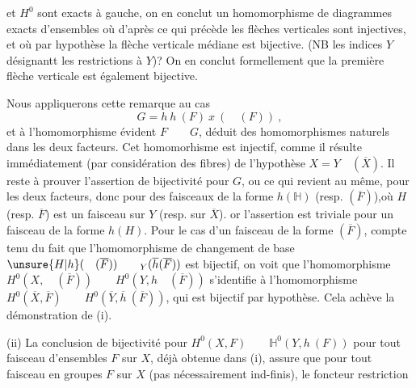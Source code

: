 
et $H^0$ sont exacts à gauche, on en conclut un homomorphisme de diagrammes exacts d'ensembles
où d'après ce qui précède les flèches verticales sont injectives, et où par hypothèse la flèche verticale médiane est bijective. (NB les indices $Y$ désignantt les restrictions à $Y$)? On en conclut formellement que la première flèche verticale est également bijective.

Nous appliquerons cette remarque au cas 
\[
G=h\ h\ (F)\ x\ (\quad(F))\ ,
\]
et à l'homomorphisme évident $F\qquad G$, déduit des homomorphismes naturels dans les deux facteurs. Cet homomorhisme est injectif, comme il résulte immédiatement (par considération des fibres) de l'hypothèse $X=Y\quad(\overline{X})$. Il reste à prouver l'assertion de bijectivité pour $G$, ou ce qui revient au même, pour les deux facteurs, donc pour des faisceaux de la forme $h(\mathbb{H})$ (resp. $(\overline{F})$),où $H$ (resp. $\overline{F}$) est un faisceau sur $Y$ (resp. sur $\overline{X}$). or l'assertion est triviale pour un faisceau de la forme $h(H)$. Pour le cas d'un faisceau de la forme $(\overline{F})$, compte tenu du fait que l'homomorphisme de changement de base $\unsure{H|h}(\quad(\overline{F}))\qquad{}_{Y}(\overline{h}(\overline{F}))$ est bijectif, on voit que l'homomorphisme $H^0(X,\quad(\overline{F}))\qquad H^0(Y,h\quad(\overline{F}))$ s'identifie à l'homomorphisme $H^0(\overline{X},\overline{F})\qquad H^0(\overline{Y},\overline{h}\ (\overline{F}))$, qui est bijectif par hypothèse. Cela achève la démonstration de (i).

(ii) La conclusion de bijectivité pour $H^0(X,F)\qquad\mathbb{H}^0(Y,h\ (F))$ \margin{\handwritten{$\unsure{\checkmark|\backslash}$}}pour tout faisceau d'ensembles $F$ sur $X$, déjà obtenue dans (i), assure  que pour tout faisceau en groupes $F$ sur $X$ (pas nécessairement ind-finis), le foncteur restriction
